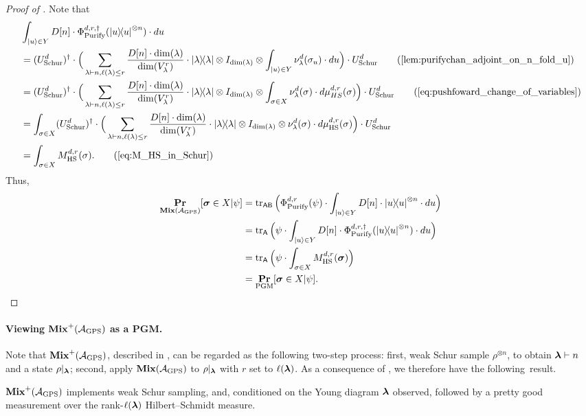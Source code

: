 \begin{proof}[Proof of ]
    Note that 
    \begin{align*}
        & \int_{\ket{u} \in Y} D[n] \cdot \purifychan^{d,r,\dagger}(\ketbra{u}^{\otimes n})  \cdot du \\
        & = (\schur^d)^\dagger \cdot \Big(\sum_{\lambda \vdash n, \ell(\lambda) \leq r} \frac{D[n] \cdot \dim(\lambda)}{\dim(V^r_\lambda)} \cdot \ketbra{\lambda} \otimes I_{\dim(\lambda)} \otimes \int_{\ket{u} \in Y} \nu^d_\lambda(\sigma_u) \cdot du \Big) \cdot \schur^d \tag{\Cref{lem:purifychan_adjoint_on_n_fold_u}}\\
        & = (\schur^d)^\dagger \cdot \Big(\sum_{\lambda \vdash n, \ell(\lambda) \leq r} \frac{D[n] \cdot \dim(\lambda)}{\dim(V^r_\lambda)} \cdot \ketbra{\lambda} \otimes I_{\dim(\lambda)} \otimes \int_{\sigma \in X} \nu^d_\lambda(\sigma) \cdot d\mu_{HS}^{d,r}(\sigma)  \Big) \cdot \schur^d \tag{\Cref{eq:pushfoward_change_of_variables}}\\
        & = \int_{\sigma \in X} (\schur^d)^\dagger \cdot \Big( \sum_{\lambda \vdash n, \ell(\lambda) \leq r} \frac{D[n] \cdot \dim(\lambda)}{\dim(V^r_\lambda)} \cdot \ketbra{\lambda} \otimes I_{\dim(\lambda)} \otimes \nu^d_\lambda(\sigma) \cdot d\mu_{\mathrm{HS}}^{d,r}(\sigma)\Big) \cdot \schur^d \\
        & = \int_{\sigma \in X} M^{d,r}_{\mathrm{HS}}(\sigma). \tag{\Cref{eq:M_HS_in_Schur}} 
    \end{align*}
    Thus,
    \begin{align*}
        \mathop{\bf Pr\/}_{\textup{\textbf{Mix}}(\mathcal{A}_{\mathrm{GPS}})}[ \boldsymbol{\sigma} \in X| \psi ] & = \tr_{\mathsf{AB}} \Big( \Phi_{\mathrm{Purify}}^{d,r}( \psi ) \cdot \int_{\ket{u} \in Y} D[n] \cdot \ketbra{u}^{\otimes n}  \cdot du\Big) \\
        & = \tr_{\mathsf{A}} \Big( \psi \cdot \int_{\ket{u} \in Y} D[n] \cdot \Phi_{\mathrm{Purify}}^{d,r,\dagger}(\ketbra{u}^{\otimes n})  \cdot du\Big) \\
        & = \tr_{\mathsf{A}} \Big( \psi \cdot \int_{\sigma \in X} M^{d,r}_{\mathrm{HS}}(\boldsymbol{\sigma}) \Big) \\
        & = \mathop{\bf Pr\/}_{\mathrm{PGM}} [ \boldsymbol{\sigma} \in X | \psi]. \qedhere
    \end{align*}
\end{proof}

\paragraph{Viewing $\textup{\textbf{Mix}}^+(\mathcal{A}_{\mathrm{GPS}})$ as a PGM.} Note that $\textup{\textbf{Mix}}^+(\mathcal{A}_{\mathrm{GPS}})$, described in , can be regarded as the following two-step process: first, weak Schur sample $\rho^{\otimes n}$, to obtain $\boldsymbol{\lambda} \vdash n$ and a state $\rho|_{\boldsymbol{\lambda}}$;  second, apply $\textup{\textbf{Mix}}(\mathcal{A}_{\mathrm{GPS}})$ to $\rho|_{\boldsymbol{\lambda}}$ with $r$ set to $\ell(\boldsymbol{\lambda})$. As a consequence of , we therefore have the following~result. 

\begin{corollary}
    $\textup{\textbf{Mix}}^+(\mathcal{A}_{\mathrm{GPS}})$ implements weak Schur sampling, and, conditioned on the Young diagram $\boldsymbol{\lambda}$ observed, followed by a pretty good measurement over the rank-$\ell(\boldsymbol{\lambda})$ Hilbert--Schmidt measure.
\end{corollary}
